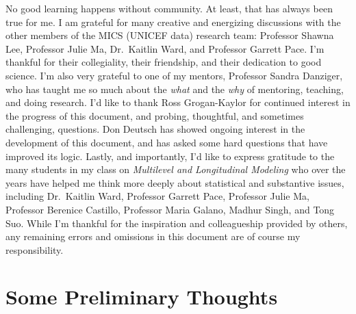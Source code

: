 \documentclass[
  letterpaper,
  DIV=11,
  numbers=noendperiod]{scrreprt}
\begin{document}
No good learning happens without community. At least, that has always
been true for me. I am grateful for many creative and energizing
discussions with the other members of the MICS (UNICEF data) research
team: Professor Shawna Lee, Professor Julie Ma, Dr.~Kaitlin Ward, and
Professor Garrett Pace. I'm thankful for their collegiality, their
friendship, and their dedication to good science. I'm also very grateful
to one of my mentors, Professor Sandra Danziger, who has taught me so
much about the \emph{what} and the \emph{why} of mentoring, teaching,
and doing research. I'd like to thank Ross Grogan-Kaylor for continued
interest in the progress of this document, and probing, thoughtful, and
sometimes challenging, questions. Don Deutsch has showed ongoing
interest in the development of this document, and has asked some hard
questions that have improved its logic. Lastly, and importantly, I'd
like to express gratitude to the many students in my class on
\emph{Multilevel and Longitudinal Modeling} who over the years have
helped me think more deeply about statistical and substantive issues,
including Dr.~Kaitlin Ward, Professor Garrett Pace, Professor Julie Ma,
Professor Berenice Castillo, Professor Maria Galano, Madhur Singh, and
Tong Suo. While I'm thankful for the inspiration and colleagueship
provided by others, any remaining errors and omissions in this document
are of course my responsibility.


\hypertarget{some-preliminary-thoughts}{%
\chapter*{Some Preliminary Thoughts}\label{some-preliminary-thoughts}}

\end{document}
